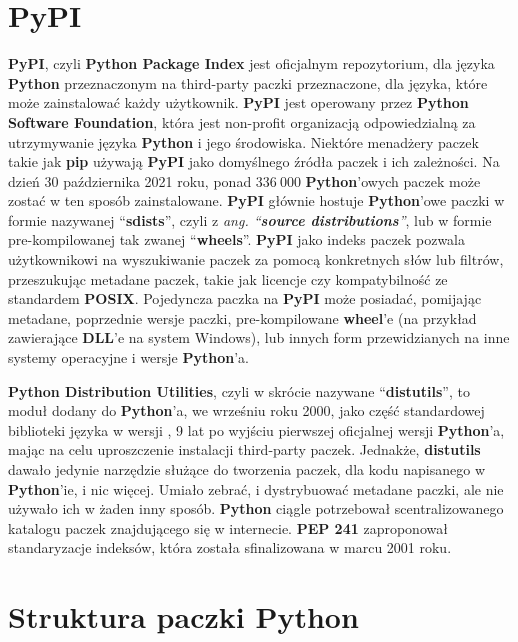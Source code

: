 \section{PyPI}

\textbf{PyPI}, \cite{PyPI} \cite{AdvancedPythonDevelopment} czyli \textbf{Python Package Index} jest oficjalnym repozytorium, dla języka \textbf{Python} przeznaczonym na third-party paczki przeznaczone, dla języka, które może zainstalować każdy użytkownik. \textbf{PyPI} jest operowany przez \textbf{Python Software Foundation}, która jest non-profit organizacją odpowiedzialną za utrzymywanie języka \textbf{Python} i jego  środowiska. Niektóre menadżery paczek takie jak \textbf{pip} \cite{Pip} używają \textbf{PyPI} jako domyślnego źródła paczek i ich zależności. Na dzień 30 października 2021 roku, ponad $336 \ 000$ \textbf{Python}'owych paczek może zostać w ten sposób zainstalowane. \textbf{PyPI} głównie hostuje \textbf{Python}'owe paczki w formie nazywanej ``\textbf{sdists}'', czyli z \textit{ang. ``\textbf{source distributions}''}, lub w formie pre-kompilowanej tak zwanej ``\textbf{wheels}''. \textbf{PyPI} jako indeks paczek pozwala użytkownikowi na wyszukiwanie paczek za pomocą konkretnych słów lub filtrów, przeszukując metadane paczek, takie jak licencje czy kompatybilność ze standardem \textbf{POSIX}. Pojedyncza paczka na \textbf{PyPI} może posiadać, pomijając metadane, poprzednie wersje paczki, pre-kompilowane \textbf{wheel}'e (na przykład zawierające \textbf{DLL}'e na system Windows), lub innych form przewidzianych na inne systemy operacyjne i wersje \textbf{Python}'a.

\textbf{Python Distribution Utilities}, czyli w skrócie nazywane ``\textbf{distutils}'', to moduł dodany do \textbf{Python}'a, we wrześniu roku 2000, jako część standardowej biblioteki języka w wersji , 9 lat po wyjściu pierwszej oficjalnej wersji \textbf{Python}'a, mając na celu uproszczenie instalacji third-party paczek.
Jednakże, \textbf{distutils} dawało jedynie narzędzie służące do tworzenia paczek, dla kodu napisanego w \textbf{Python}'ie, i nic więcej. Umiało zebrać, i dystrybuować metadane paczki, ale nie używało ich w żaden inny sposób. \textbf{Python} ciągle potrzebował scentralizowanego katalogu paczek znajdującego się w internecie. \textbf{PEP 241} \cite{PEP241} zaproponował standaryzacje indeksów, która została sfinalizowana w marcu 2001 roku.


\clearpage
\section{Struktura paczki Python}

